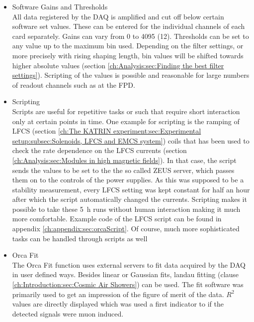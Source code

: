 \begin{itemize}
    \item Software Gains and Thresholds\\
    All data registered by the DAQ is amplified and cut off below certain software set values. These can be entered for the individual channels of each card separately. Gains can vary from \SI{0}{} to \SI{4095}{} (\SI{12}{\bit}). Thresholds can be set to any value up to the maximum bin used. Depending on the filter settings, or more precisely with rising shaping length, bin values will be shifted towards higher absolute values (section \ref{ch:Analysis:sec:Finding the best filter settings}).
    Scripting of the values is possible and reasonable for large numbers of readout channels such as at the FPD.
    \item Scripting\\
    Scripts are useful for repetitive tasks or such that require short interaction only at certain points in time. One example for scripting is the ramping of LFCS (section \ref{ch:The KATRIN experiment:sec:Experimental setup:subsec:Solenoids, LFCS and EMCS system}) coils that has been used to check the rate dependence on the LFCS currents (section \ref{ch:Analysis:sec:Modules in high magnetic fields}). In that case, the script sends the values to be set to the the so called ZEUS server, which passes them on to the controls of the power supplies. As this was supposed to be a stability measurement, every LFCS setting was kept constant for half an hour after which the script automatically changed the currents. Scripting makes it possible to take these \SI{5}{\hour} runs without human interaction making it much more comfortable. Example code of the LFCS script can be found in appendix \ref{ch:appendix:sec:orcaScript}. Of course, much more sophisticated tasks can be handled through scripts as well
    \item Orca Fit\\
    The Orca Fit function uses external servers to fit data acquired by the DAQ in user defined ways. Besides linear or Gaussian fits, landau fitting (clause \ref{ch:Introduction:sec:Cosmic Air Showers}) can be used. The fit software was primarily used to get an impression of the figure of merit of the data. $R^2$ values are directly displayed which was used a first indicator to if the detected signals were muon induced.
  \end{itemize}
  
